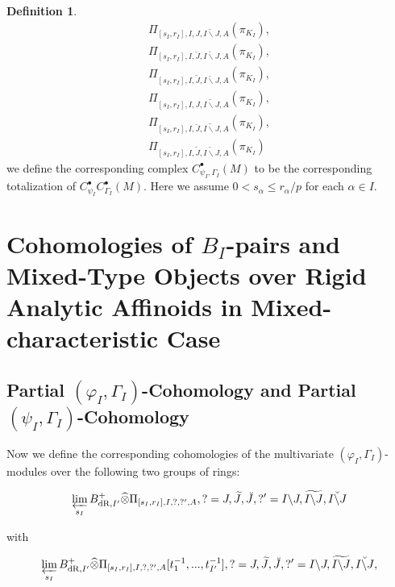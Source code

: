 \documentclass[12pt]{amsart}
\theoremstyle{definition}
\newtheorem{definition}[theorem]{Definition}
\numberwithin{equation}{section}
\begin{document}
\begin{definition}
\begin{align}
\Pi_{[s_I,r_I],I,J,\breve{I\backslash J},A}(\pi_{K_I}),\\	
\Pi_{[s_I,r_I],I,\breve{J},\breve{I\backslash J},A}(\pi_{K_I}),\\
\Pi_{[s_I,r_I],I,\widetilde{J},\breve{I\backslash J},A}(\pi_{K_I}),\\
\Pi_{[s_I,r_I],I,J,\widetilde{I\backslash J},A}(\pi_{K_I}),\\	
\Pi_{[s_I,r_I],I,\breve{J},\widetilde{I\backslash J},A}(\pi_{K_I}),\\
\Pi_{[s_I,r_I],I,\widetilde{J},\widetilde{I\backslash J},A}(\pi_{K_I})	
\end{align}	
we define the corresponding complex $C^\bullet_{\psi_I,\Gamma_I}(M)$ to be the corresponding totalization of $C^\bullet_{\psi_I}C^\bullet_{\Gamma_I}(M)$. Here we assume $0< s_\alpha \leq r_\alpha/p$ for each $\alpha\in I$.	
	
\end{definition}





\newpage

\section{Cohomologies of $B_I$-pairs and Mixed-Type Objects over Rigid Analytic Affinoids in Mixed-characteristic Case}

\subsection{Partial $(\varphi_I,\Gamma_I)$-Cohomology and Partial $(\psi_I,\Gamma_I)$-Cohomology}

\noindent Now we define the corresponding cohomologies of the multivariate $(\varphi_I,\Gamma_I)$-modules over the following two groups of rings:


\begin{align}
\varprojlim_{s_I}  B^+_{\mathrm{dR},I'}	\widehat{\otimes}\Pi_{[s_I,r_I],I,?,?',A},?=J,\widetilde{J},\breve{J},?'=I\backslash J,\widetilde{I\backslash J},\breve{I\backslash J}\\
\end{align}

with

\begin{align}
\varprojlim_{s_I} B^+_{\mathrm{dR},I'}	\widehat{\otimes}\Pi_{[s_I,r_I],I,?,?',A}[t_1^{-1},...,t_{I'}^{-1}],?=J,\widetilde{J},\breve{J},?'=I\backslash J,\widetilde{I\backslash J},\breve{I\backslash J},\\
\end{align}
\end{document}
